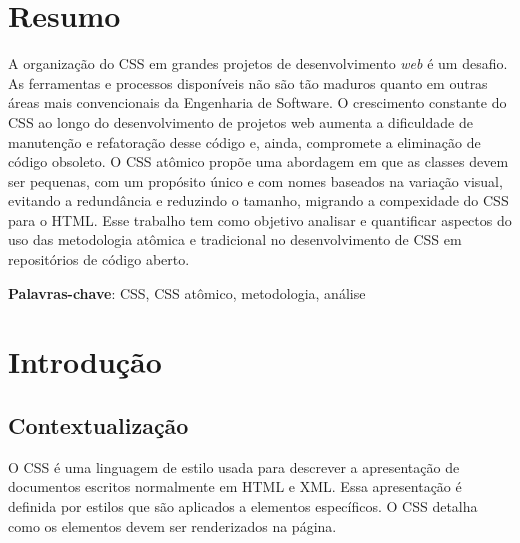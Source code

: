 \makeatletter
\def\fps@figure{htbp}
\makeatother


\date{}
\setcounter{chapter}{1}



\imprimirfolhaderosto*








\hypertarget{resumo}{%
\chapter{Resumo}\label{resumo}}
\hfill \break
A organização do CSS em grandes projetos de desenvolvimento \emph{web} é
um desafio. As ferramentas e processos disponíveis não são tão maduros quanto em outras áreas mais convencionais da Engenharia de Software. O crescimento constante do CSS ao longo do desenvolvimento de projetos web aumenta a dificuldade de manutenção e refatoração desse código e, ainda, compromete a eliminação de código obsoleto. O CSS atômico
propõe uma abordagem em que as classes devem ser pequenas, com um
propósito único e com nomes baseados na variação visual, evitando a
redundância e reduzindo o tamanho, migrando a compexidade do CSS para o HTML.
Esse trabalho tem como objetivo analisar e quantificar aspectos do uso das metodologia atômica e tradicional no desenvolvimento de CSS em repositórios de código aberto.

\vspace{\onelineskip}

\noindent
\textbf{Palavras-chave}: CSS, CSS atômico, metodologia, análise


\newpage

\hypertarget{introduuxe7uxe3o}{%
\chapter{Introdução}\label{introduuxe7uxe3o}}

\hypertarget{contextualizauxe7uxe3o}{%
\section{Contextualização}\label{contextualizauxe7uxe3o}}

O CSS é uma linguagem de estilo usada para descrever a
apresentação de documentos escritos normalmente em HTML e XML. Essa
apresentação é definida por estilos que são aplicados a elementos
específicos. O CSS detalha como os elementos devem ser renderizados na
página.

